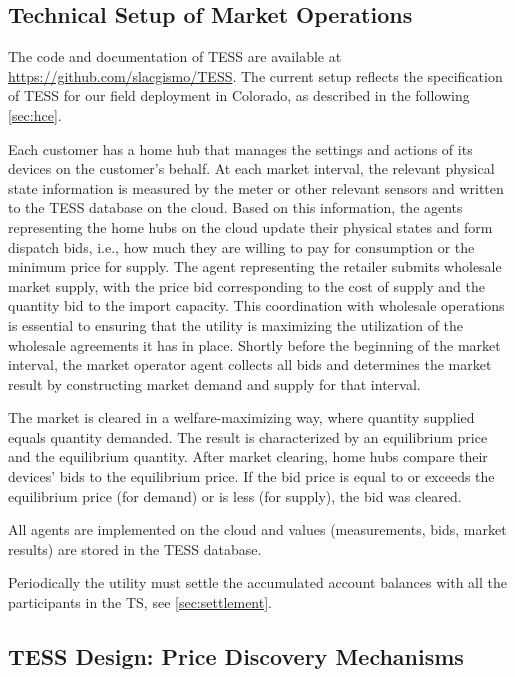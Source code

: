 \subsection{Technical Setup of Market Operations}\label{sec:technical_setup}

The code and documentation of TESS are available at \url{https://github.com/slacgismo/TESS}. The current setup reflects the specification of TESS for our field deployment in Colorado, as described in the following \cref{sec:hce}.

Each customer has a home hub that manages the settings and actions of its devices on the customer's behalf. At each market interval, the relevant physical state information is measured by the meter or other relevant sensors and written to the TESS database on the cloud.
Based on this information, the agents representing the home hubs on the cloud update their physical states and form dispatch bids, i.e., how much they are willing to pay for consumption or the minimum price for supply. 
The agent representing the retailer submits wholesale market supply, with the price bid corresponding to the cost of supply and the quantity bid to the import capacity. This coordination with wholesale operations is essential to ensuring that the utility is maximizing the utilization of the wholesale agreements it has in place.
Shortly before the beginning of the market interval, the market operator agent collects all bids and determines the market result by constructing market demand and supply for that interval. 

The market is cleared in a welfare-maximizing way, where quantity supplied equals quantity demanded. The result is characterized by an equilibrium price and the equilibrium quantity.
After market clearing, home hubs compare their devices' bids to the equilibrium price. If the bid price is equal to or exceeds the equilibrium price (for demand) or is less (for supply), the bid was cleared. 

All agents are implemented on the cloud and values (measurements, bids, market results) are stored in the TESS database.

Periodically the utility must settle the accumulated account balances with all the participants in the TS, see \cref{sec:settlement}.

\subsection{TESS Design: Price Discovery Mechanisms}\label{sec:price_discovery}

